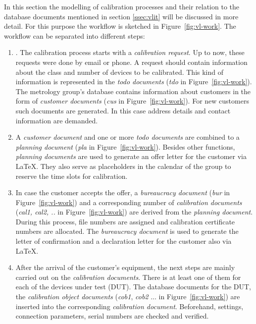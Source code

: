 \documentclass[3p,times,procedia]{elsarticle}
\begin{document}
In this section the modelling of calibration processes and their relation
to the database documents mentioned in section \ref{ssec:vlit} will be
discussed in more detail.  For this purpose the workflow is sketched
in Figure~\ref{fig:vl-work}. The workflow can be separated into different steps:

\begin{enumerate}
  
\item\label{itm:calreq}. The calibration process starts with a \emph{calibration
  request}. Up to now, these requests were done by email or phone. A request
  should contain information about the class and number of devices to be
  calibrated. This kind of information is represented in the \emph{todo
    documents} %
  (\emph{tdo} in Figure~\ref{fig:vl-work}).  The metrology group's database contains
  information about customers in the form of \emph{customer documents}
  (\emph{cus} in Figure~\ref{fig:vl-work}). For new customers such
  documents are generated. In this case address details and contact
  information are demanded. 
  
\item\label{itm:pla} A \emph{customer document} and one or more
  \emph{todo documents} are combined to a \emph{planning document}
  (\emph{pla} in Figure~\ref{fig:vl-work}). Besides other functions,
  \emph{planning documents} are used to generate an offer letter for
  the customer via \LaTeX. They also serve as placeholders in the 
  calendar of the group to reserve the time slots for calibration.  %
  
\item In case the customer accepts the offer, a \emph{bureaucracy
  document} (\emph{bur} in Figure~\ref{fig:vl-work}) and a
  corresponding number of \emph{calibration documents} (\emph{cal1,
    cal2, ..} in Figure~\ref{fig:vl-work}) are derived from the
  \emph{planning document}. During this process, file numbers are
  assigned and calibration certificate numbers are allocated. The
  \emph{bureaucracy document} is used to generate the letter of
  confirmation and a declaration letter for the customer also via
  \LaTeX.

\item After the arrival of the customer's equipment, the next steps are mainly
  carried out on the \emph{calibration documents}. There is at least one of
  them for each of the devices under test (DUT). The database documents
  for the DUT, the \emph{calibration object documents} (\emph{cob1},
  \emph{cob2} ...  in Figure~\ref{fig:vl-work}) are inserted into
  the corresponding \emph{calibration document}. Beforehand, settings,
  connection parameters, serial numbers are checked and verified.


\end{enumerate}
\end{document}
